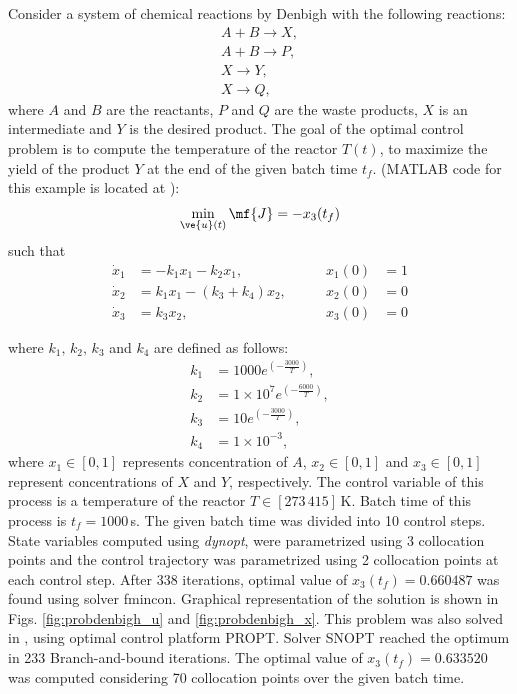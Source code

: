 Consider a system of chemical reactions by Denbigh \cite{den58} with the 
following reactions:
\begin{gather}
A + B \rightarrow X, \\
A + B \rightarrow P, \\
X \rightarrow Y, \\
X \rightarrow Q, 
\end{gather}
where $A$ and $B$ are the reactants, $P$ and $Q$ are the waste products, $X$ is an intermediate and $Y$ is the desired product. The goal of the optimal control problem is to compute the temperature of the reactor $T(t)$, to maximize the yield of the product $Y$ at the end of the given batch time $t_f$. (MATLAB code for this example is located
at ):
\begin{equation}
\min_{\ve{u}(t)} \mf{J} = -x_{3}(t_{f}) \label{eq:denbigh_dae}
\end{equation}
such that
\begin{align}
\dot{x}_1 & =  -k_{1}x_{1} -k_{2}x_{1} , &\qquad x_1(0) &= 1 \\
\dot{x}_{2}& = k_{1}x_{1} - (k_{3} + k_{4})x_{2} , & \qquad x_2(0) & = 0 \\
\dot{x}_3 & =  k_{3}x_{2} , & \qquad x_3(0) & = 0 
\end{align}

where $k_{1}, \, k_{2}, \, k_{3}$ and $k_{4}$ are defined as follows:
\begin{align}
k_{1} &= 1000 e^{(-\frac{3000}{T})}, \\
k_{2} &= 1 \times 10^{7} e^{(-\frac{6000}{T})}, \\
k_{3} &= 10e^{(-\frac{3000}{T})}, \\
k_{4} &= 1 \times 10^{-3}, 
\end{align} where $x_{1} \in [0, 1] $  represents concentration
of $A$, $x_{2} \in [0, 1] $ and $x_{3} \in [0, 1]$  represent concentrations
of $X$ and $Y$, respectively. The control variable of this process is a temperature of the reactor $T \in [273 \,  415]$\,K.
Batch time of this process is $t_{f} = 1000$\,s. The given batch time was divided into 10 control steps. State variables computed using \emph{dynopt}, were parametrized using 3 collocation points and the control trajectory was parametrized using 2 collocation points at each control step.  After 338 iterations, optimal value of $x_{3}(t_{f}) = 0.660487$ was
found using solver fmincon. Graphical representation of the solution is shown in Figs. \ref{fig:probdenbigh_u}
and \ref{fig:probdenbigh_x}. This problem was also solved in \cite{rut10}, using optimal control platform PROPT. Solver SNOPT reached the optimum in 233 Branch-and-bound iterations. The optimal value of  $x_{3}(t_{f}) = 0.633520$ was computed considering 70 collocation points over the given batch time. 

